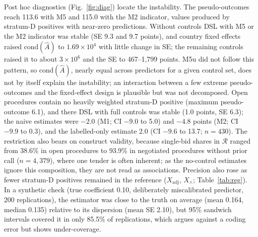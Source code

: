 \documentclass[runningheads]{llncs}
\begin{document}
Post hoc diagnostics (Fig.~\ref{fig:diag}) locate the instability. The pseudo-outcomes reach 113.6 with M5 and 115.0 with the M2 indicator, values produced by stratum-D positives with near-zero predictions. Without controls DSL with M5 or the M2 indicator was stable (SE 9.3 and 9.7 points), and country fixed effects raised $\mathrm{cond}(\hat{A})$ to $1.69\times10^4$ with little change in SE; the remaining controls raised it to about $3\times10^6$ and the SE to 467--1,799 points. M5u did not follow this pattern, so $\mathrm{cond}(\hat{A})$, nearly equal across predictors for a given control set, does not by itself explain the instability; an interaction between a few extreme pseudo-outcomes and the fixed-effect design is plausible but was not decomposed. Open procedures contain no heavily weighted stratum-D positive (maximum pseudo-outcome 6.1), and there DSL with full controls was stable (1.0 points, SE 6.3); the naive estimates were $-2.0$ (M1; CI $-9.0$ to 5.0) and $-4.8$ points (M2; CI $-9.9$ to 0.3), and the labelled-only estimate 2.0 (CI $-9.6$ to 13.7; $n=430$). The restriction also bears on construct validity, because single-bid shares in $\mathcal{R}$ ranged from 38.6\% in open procedures to 93.9\% in negotiated procedures without prior call ($n=4{,}379$), where one tender is often inherent; as the no-control estimates ignore this composition, they are not read as associations. Precision also rose as fewer stratum-D positives remained in the reference ($X_{\mathrm{adj}}$, $X_\wedge$; Table~\ref{tab:reg}). In a synthetic check (true coefficient 0.10, deliberately miscalibrated predictor, 200 replications), the estimator was close to the truth on average (mean 0.164, median 0.135) relative to its dispersion (mean SE 2.10), but 95\% sandwich intervals covered it in only 85.5\% of replications, which argues against a coding error but shows under-coverage.
\end{document}
